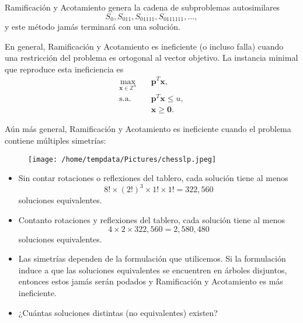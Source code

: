 \documentclass[aspectratio=169,professionalfonts]{beamer}
\newcommand{\Z}{\mathbb{Z}}
\renewcommand{\vec}[1]{\boldsymbol{#1}}
\begin{document}
\begin{frame}
	Ramificación y Acotamiento genera la cadena de subproblemas autosimilares
	\begin{equation*}
		S_{0}, S_{011}, S_{01111}, S_{0111111}, \ldots,
	\end{equation*}
	y este método jamás terminará con una solución.
\end{frame}

\begin{frame}
	En general, Ramificación y Acotamiento es ineficiente (o incluso falla) cuando una
	restricción del problema es ortogonal al vector objetivo. La instancia minimal que reproduce
	esta ineficiencia es
	\begin{subequations}
		\label{theory:formulation}
		\begin{align}
			\max_{\vec{x} \in \Z^n} \quad
				& \vec{p}^T\vec{x}, \label{theory:objective} \\
			\text{s.a.} \quad
				& \vec{p}^T\vec{x} \leq u, \label{theory:constraint:budget} \\
				& \vec{x} \geq \vec{0}. \nonumber
		\end{align}
	\end{subequations}
\end{frame}

\begin{frame}
	Aún más general, Ramificación y Acotamiento es ineficiente cuando el
	problema contiene múltiples simetrías:
	\begin{figure}
		\texttt{[image: /home/tempdata/Pictures/chesslp.jpeg]}
	\end{figure}
\end{frame}

\begin{frame}
	\begin{itemize}
		\item Sin contar rotaciones o reflexiones del tablero, cada solución
			tiene al menos
		\begin{equation*}
			8! \times (2!)^3 \times 1! \times 1! = 322{,}560
		\end{equation*}
		soluciones equivalentes.
		\item Contanto rotaciones y reflexiones del tablero, cada solución
			tiene al menos
		\begin{equation*}
			4 \times 2 \times 322{,}560 = 2{,}580{,}480
		\end{equation*}
		soluciones equivalentes.
		\item Las simetrías dependen de la formulación que utilicemos. Si la
			formulación induce a que las soluciones equivalentes se encuentren
			en árboles disjuntos, entonces estos jamás serán podados y
			Ramificación y Acotamiento es más ineficiente.
		\item ¿Cuántas soluciones distintas (no equivalentes) existen?
	\end{itemize}
\end{frame}
\end{document}
